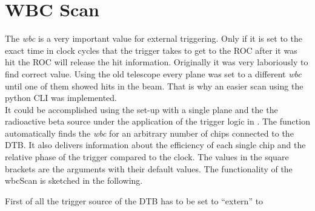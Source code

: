 \documentclass[british,11pt,a4paper]{memoir}
\begin{document}
\section{WBC Scan}
The \textit{wbc} is a very important value for external triggering. Only if it is set to the exact time in clock cycles that the trigger takes to get to the \ac{ROC} after it was hit the \ac{ROC} will release the hit information. Originally it was very laboriously to find correct value. Using the old telescope every plane was set to a different \textit{wbc} until one of them showed hits in the beam. That is why an easier scan using the python \ac{CLI} was implemented.\\
It could be accomplished using the set-up with a single plane and the the radioactive beta source  under the application of the trigger logic in . The function 
automatically finds the \textit{wbc} for an arbitrary number of chips connected to the \ac{DTB}. It also delivers information about the efficiency of each single chip and the relative phase of the trigger compared to the clock. The values in the square brackets are the arguments with their default values. The functionality of the wbcScan is sketched in the following.\par\vspace*{-5pt}
First of all the trigger source of the \ac{DTB} has to be set to ``extern'' to 
\end{document}
